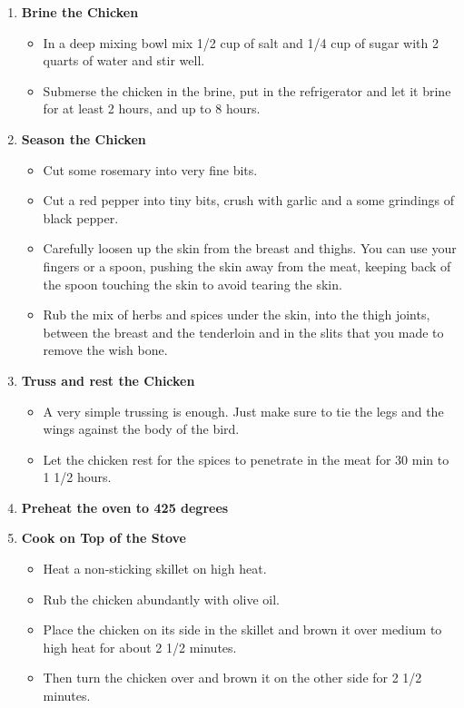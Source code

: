 \documentclass[11pt,letterpaper]{article}
\begin{document}
\begin {description}
\begin{enumerate}
\item {\bf Brine the Chicken}
\begin{itemize}
\item In a deep mixing bowl mix 1/2 cup of salt and 1/4 cup of sugar with 2 quarts of water and stir well. 
\item Submerse the chicken in the brine, put in the refrigerator and let it brine for at least 2 hours, and up to 8 hours.
\end{itemize}

\item {\bf Season the Chicken}
\begin{itemize}
\item Cut some rosemary into very fine bits.
\item Cut a red pepper into tiny bits, crush with garlic and a some grindings of black pepper. 
\item Carefully loosen up the skin from the breast and thighs. You can use your fingers or a spoon, pushing the skin away from the meat, keeping back of the spoon touching the skin to avoid tearing the skin.
\item Rub the mix of herbs and spices under the skin, into the thigh joints, between the breast and the tenderloin and in the slits that you made to remove the wish bone.
\end{itemize}

\item {\bf Truss and rest the Chicken}
\begin{itemize}
\item A very simple trussing is enough. Just make sure to tie the legs and the wings against the body of the bird.
\item Let the chicken rest for the spices to penetrate in the meat for 30 min to 1 1/2 hours.
\end{itemize}

\item{\bf Preheat the oven to 425 degrees}

\item{\bf Cook on Top of the Stove}
\begin{itemize}
\item Heat a non-sticking skillet on high heat. 
\item Rub the chicken abundantly with olive oil. 
\item Place the chicken on its side in the skillet and brown it over medium to high heat for about 2 1/2 minutes. 
\item Then turn the chicken over and brown it on the other side for 2 1/2 minutes.
\end{itemize}


\end{enumerate}
\end{description}
\end{document}
